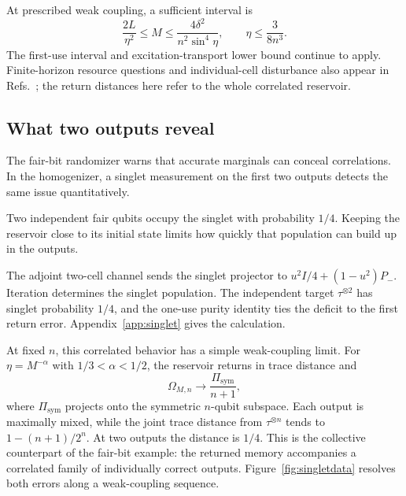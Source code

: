 \documentclass[aps,pra,reprint,superscriptaddress,longbibliography,nofootinbib,floatfix]{revtex4-2}
\begin{document}
At prescribed weak coupling, a sufficient interval is
\begin{equation}
 \frac{2L}{\eta^2}\le M\le\frac{4\delta^2}{n^2\sin^4\eta},
 \qquad \eta\le\frac{3}{8n^3}.
 \label{eq:prescribedmany}
\end{equation}
The first-use interval and excitation-transport lower bound continue to apply. Finite-horizon resource questions and individual-cell disturbance also appear in Refs.~\cite{vm,beever}; the return distances here refer to the whole correlated reservoir.

\subsection{What two outputs reveal}

The fair-bit randomizer warns that accurate marginals can conceal correlations. In the homogenizer, a singlet measurement on the first two outputs detects the same issue quantitatively.


Two independent fair qubits occupy the singlet with probability $1/4$. Keeping the reservoir close to its initial state limits how quickly that population can build up in the outputs.

The adjoint two-cell channel sends the singlet projector to $u^2I/4+(1-u^2)P_-$. Iteration determines the singlet population. The independent target $\tau^{\otimes2}$ has singlet probability $1/4$, and the one-use purity identity ties the deficit to the first return error. Appendix~\ref{app:singlet} gives the calculation.

At fixed $n$, this correlated behavior has a simple weak-coupling limit. For $\eta=M^{-\alpha}$ with $1/3<\alpha<1/2$, the reservoir returns in trace distance and
\begin{equation}
 \Omega_{M,n}\longrightarrow\frac{\Pi_{\mathrm{sym}}}{n+1},
 \label{eq:collectivetwirl}
\end{equation}
where $\Pi_{\mathrm{sym}}$ projects onto the symmetric $n$-qubit subspace. Each output is maximally mixed, while the joint trace distance from $\tau^{\otimes n}$ tends to $1-(n+1)/2^n$. At two outputs the distance is $1/4$. This is the collective counterpart of the fair-bit example: the returned memory accompanies a correlated family of individually correct outputs. Figure~\ref{fig:singletdata} resolves both errors along a weak-coupling sequence.
\end{document}
